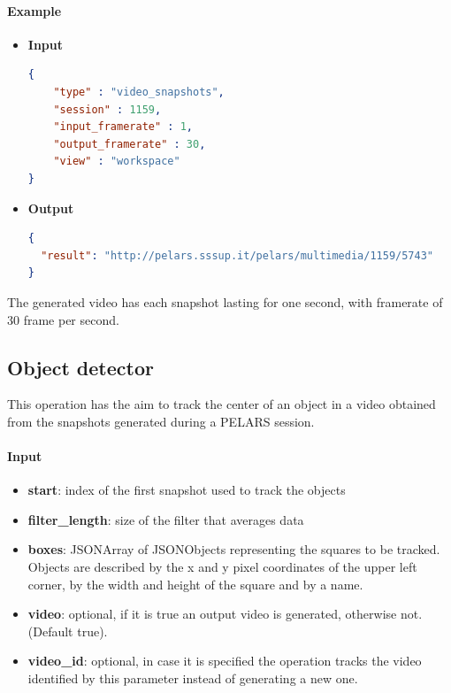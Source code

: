 \documentclass[a4paper,notitlepage,onecolumn]{hitec}  %
\begin{document}
\paragraph{Example}
\begin{itemize}
\item\textbf{Input}
\begin{lstlisting}[language=json,firstnumber=1]
{
    "type" : "video_snapshots",
    "session" : 1159,
    "input_framerate" : 1,
    "output_framerate" : 30,
    "view" : "workspace"
}
\end{lstlisting}

\item\textbf{Output}
\begin{lstlisting}[language=json,firstnumber=1]
{
  "result": "http://pelars.sssup.it/pelars/multimedia/1159/5743"
}
\end{lstlisting}
\end{itemize}
The generated video has each snapshot lasting for one second, with framerate of 30 frame per second.

\subsection{Object detector}
This operation has the aim to track the center of an object in a video obtained from the snapshots generated during a PELARS session.

\paragraph{Input}
\begin{itemize}
\item\textbf{start}: index of the first snapshot used to track the objects
\item\textbf{filter\_length}: size of the filter that averages data
\item\textbf{boxes}: JSONArray of JSONObjects representing the squares to be tracked. Objects are described by the x and y pixel coordinates of the upper left corner, by the width and height of the square and by a name.
\item\textbf{video}: optional, if it is true an output video is generated, otherwise not. (Default true).
\item\textbf{video\_id}: optional, in case it is specified the operation tracks the video identified by this parameter instead of generating a new one.
\end{itemize}
\end{document}
